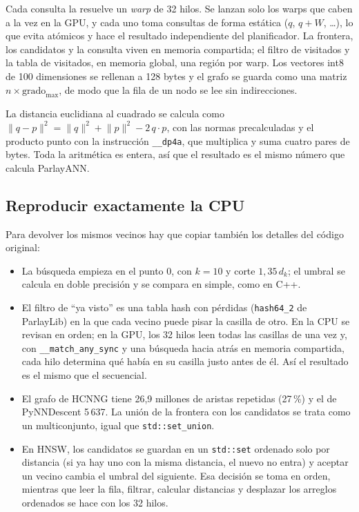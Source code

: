 \documentclass[conference,10pt]{IEEEtran}
\begin{document}
Cada consulta la resuelve un \emph{warp} de 32 hilos. Se lanzan solo los warps que caben
a la vez en la GPU, y cada uno toma consultas de forma estática ($q$, $q+W$, \dots), lo que
evita atómicos y hace el resultado independiente del planificador. La frontera, los
candidatos y la consulta viven en memoria compartida; el filtro de visitados y la tabla
de visitados, en memoria global, una región por warp. Los vectores int8 de 100
dimensiones se rellenan a 128 bytes y el grafo se guarda como una matriz
$n \times \text{grado}_{\max}$, de modo que la fila de un nodo se lee sin indirecciones.

La distancia euclidiana al cuadrado se calcula como
$\lVert q-p\rVert^2 = \lVert q\rVert^2 + \lVert p\rVert^2 - 2\,q\cdot p$, con las normas
precalculadas y el producto punto con la instrucción \texttt{\_\_dp4a}, que multiplica y
suma cuatro pares de bytes. Toda la aritmética es entera, así que el resultado es el
mismo número que calcula ParlayANN.

\subsection{Reproducir exactamente la CPU}

Para devolver los mismos vecinos hay que copiar también los detalles del código original:
\begin{itemize}
\item La búsqueda empieza en el punto 0, con $k=10$ y corte $1{,}35\,d_k$; el umbral se
calcula en doble precisión y se compara en simple, como en C++.
\item El filtro de ``ya visto'' es una tabla hash con pérdidas
(\texttt{hash64\_2} de ParlayLib) en la que cada vecino puede pisar la casilla de otro.
En la CPU se revisan en orden; en la GPU, los 32 hilos leen todas las casillas de una vez
y, con \texttt{\_\_match\_any\_sync} y una búsqueda hacia atrás en memoria compartida,
cada hilo determina qué había en su casilla justo antes de él. Así el resultado es el
mismo que el secuencial.
\item El grafo de HCNNG tiene 26,9 millones de aristas repetidas (27\,\%) y el de
PyNNDescent 5\,637. La unión de la frontera con los candidatos se trata como un
multiconjunto, igual que \texttt{std::set\_union}.
\item En HNSW, los candidatos se guardan en un \texttt{std::set} ordenado solo por
distancia (si ya hay uno con la misma distancia, el nuevo no entra) y aceptar un vecino
cambia el umbral del siguiente. Esa decisión se toma en orden, mientras que leer la fila,
filtrar, calcular distancias y desplazar los arreglos ordenados se hace con los 32 hilos.
\end{itemize}
\end{document}
